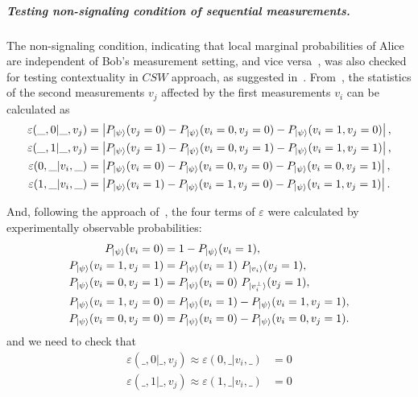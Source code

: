 \documentclass[pra,aps,notitlepage,superscriptaddress,showpacs,showkeys]{revtex4-1}
\theoremstyle{definition}
\theoremstyle{remark}
\begin{document}
 \subparagraph{Testing non-signaling condition of sequential measurements.}
 The non-signaling condition, indicating that local marginal probabilities of Alice are independent of Bob's measurement setting, and vice versa~\cite{Brunner14}, was also checked for testing contextuality in $CSW$ approach, as suggested in~\cite{cabello16s, yxiao17s}.
 From~\cite{cabello16s}, the statistics of the second measurements $v_j$ affected by the first measurements $v_i$ can be calculated as
 \begin{subequations}
    \begin{align}
        \varepsilon(\_, 0|\_, v_j) &= \left| P_{\ket{\psi}} (v_j = 0) - P_{\ket{\psi}} (v_i = 0, v_j = 0) - P_{\ket{\psi}} (v_i = 1, v_j = 0) \right|, \\
        \varepsilon(\_, 1|\_, v_j) &= \left| P_{\ket{\psi}} (v_j = 1) - P_{\ket{\psi}} (v_i = 0, v_j = 1) - P_{\ket{\psi}} (v_i = 1, v_j = 1) \right|, \\
        \varepsilon(0, \_|v_i, \_) &= \left| P_{\ket{\psi}} (v_i = 0) - P_{\ket{\psi}} (v_i = 0, v_j = 0) - P_{\ket{\psi}} (v_i = 0, v_j = 1) \right|, \\
        \varepsilon(1, \_|v_i, \_) &= \left| P_{\ket{\psi}} (v_i = 1) - P_{\ket{\psi}} (v_i = 1, v_j = 0) - P_{\ket{\psi}} (v_i = 1, v_j = 1) \right|.
    \end{align}
 \end{subequations}

 And, following the approach of~\cite{yxiao17s}, the four terms of $\varepsilon$ were calculated by experimentally observable probabilities:
 \begin{subequations}
    \begin{align}
    \label{eq:avert-a}
        P_{\ket{\psi}} (v_i = 0) &= 1 - P_{\ket{\psi}} (v_i = 1), \\
    \label{eq:avert-b}
        P_{\ket{\psi}} (v_i = 1, v_j = 1) &= P_{\ket{\psi}} (v_i = 1) ~ P_{\ket{v_i}} (v_j = 1), \\
    \label{eq:avert-c}
        P_{\ket{\psi}} (v_i = 0, v_j = 1) &= P_{\ket{\psi}} (v_i = 0) ~ P_{\ket{v_i^\perp}} (v_j = 1), \\
    \label{eq:avert-d}
        P_{\ket{\psi}} (v_i = 1, v_j = 0) &= P_{\ket{\psi}} (v_i = 1) - P_{\ket{\psi}} (v_i = 1, v_j = 1), \\
    \label{eq:avert-e}
        P_{\ket{\psi}} (v_i = 0, v_j = 0) &= P_{\ket{\psi}} (v_i = 0) - P_{\ket{\psi}} (v_i = 0, v_j = 1).
    \end{align}
 \end{subequations}
 and we need to check that
 \begin{subequations}
    \begin{align}
        \varepsilon(\_, 0|\_, v_j) \approx \varepsilon(0, \_|v_i, \_) &= 0 \\
        \varepsilon(\_, 1|\_, v_j) \approx \varepsilon(1, \_|v_i, \_) &= 0
    \end{align}
    \label{eq:epsij}
 \end{subequations}
\end{document}
